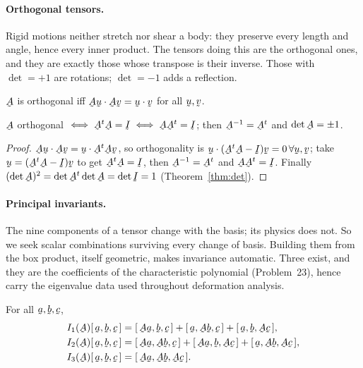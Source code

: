 \paragraph*{Orthogonal tensors.}
Rigid motions neither stretch nor shear a body: they preserve every length
and angle, hence every inner product. The tensors doing this are the
orthogonal ones, and they are exactly those whose transpose is their
inverse. Those with $\det=+1$ are rotations; $\det=-1$ adds a reflection.

\begin{definition}[Orthogonal]\label{def:orth}
$\bA$ is orthogonal iff $\ip{\bA\bu}{\bA\bv}=\ip\bu\bv$ for all $\bu,\bv$.
\end{definition}

\begin{proposition}\label{prop:orth}
$\bA$ orthogonal $\iff\bA^{t}\bA=\I\iff\bA\bA^{t}=\I$; then
$\bA^{-1}=\bA^{t}$ and $\det\bA=\pm1$.
\end{proposition}

\begin{proof}
$\ip{\bA\bu}{\bA\bv}=\ip\bu{\bA^{t}\bA\bv}$, so orthogonality is
$\ip\bu{(\bA^{t}\bA-\I)\bv}=0\,\forall\bu,\bv$; take
$\bu=(\bA^{t}\bA-\I)\bv$ to get $\bA^{t}\bA=\I$, then
$\bA^{-1}=\bA^{t}$ and $\bA\bA^{t}=\I$. Finally
$(\det\bA)^{2}=\det\bA^{t}\det\bA=\det\I=1$ (Theorem~\ref{thm:det}).
\end{proof}

\paragraph*{Principal invariants.}
The nine components of a tensor change with the basis; its physics does
not. So we seek scalar combinations surviving every change of basis.
Building them from the box product, itself geometric, makes invariance
automatic. Three exist, and they are the coefficients of the characteristic
polynomial (Problem~23), hence carry the eigenvalue data used throughout
deformation analysis.

\begin{definition}[Invariants]\label{def:inv3}
For all $\ba,\bb,\bc$,
\[
\begin{aligned}
I_{1}(\bA)\tbox\ba\bb\bc&=\tbox{\bA\ba}\bb\bc+\tbox\ba{\bA\bb}\bc+\tbox\ba\bb{\bA\bc},\\
I_{2}(\bA)\tbox\ba\bb\bc&=\tbox{\bA\ba}{\bA\bb}\bc+\tbox{\bA\ba}\bb{\bA\bc}+\tbox\ba{\bA\bb}{\bA\bc},\\
I_{3}(\bA)\tbox\ba\bb\bc&=\tbox{\bA\ba}{\bA\bb}{\bA\bc}.
\end{aligned}
\]
\end{definition}

